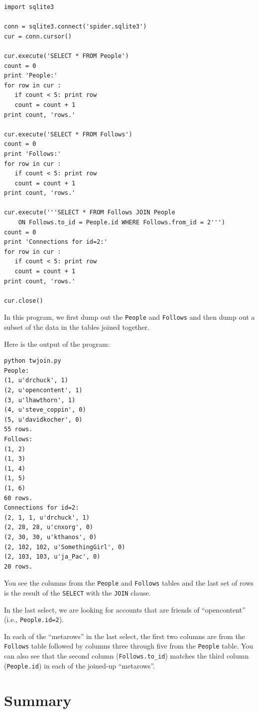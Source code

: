 \beforeverb
\begin{verbatim}
import sqlite3

conn = sqlite3.connect('spider.sqlite3')
cur = conn.cursor()

cur.execute('SELECT * FROM People')
count = 0
print 'People:'
for row in cur :
   if count < 5: print row
   count = count + 1
print count, 'rows.'

cur.execute('SELECT * FROM Follows')
count = 0
print 'Follows:'
for row in cur :
   if count < 5: print row
   count = count + 1
print count, 'rows.'

cur.execute('''SELECT * FROM Follows JOIN People 
    ON Follows.to_id = People.id WHERE Follows.from_id = 2''')
count = 0
print 'Connections for id=2:'
for row in cur :
   if count < 5: print row
   count = count + 1
print count, 'rows.'

cur.close()
\end{verbatim}
\afterverb
%
In this program, we first dump out the {\tt People}
and {\tt Follows} and then dump out a subset of the
data in the tables joined together.

Here is the output of the program:

\beforeverb
\begin{verbatim}
python twjoin.py 
People:
(1, u'drchuck', 1)
(2, u'opencontent', 1)
(3, u'lhawthorn', 1)
(4, u'steve_coppin', 0)
(5, u'davidkocher', 0)
55 rows.
Follows:
(1, 2)
(1, 3)
(1, 4)
(1, 5)
(1, 6)
60 rows.
Connections for id=2:
(2, 1, 1, u'drchuck', 1)
(2, 28, 28, u'cnxorg', 0)
(2, 30, 30, u'kthanos', 0)
(2, 102, 102, u'SomethingGirl', 0)
(2, 103, 103, u'ja_Pac', 0)
20 rows.
\end{verbatim}
\afterverb
%
You see the columns from the {\tt People} and {\tt Follows} tables and the last
set of rows is the result of the {\tt SELECT} with the {\tt JOIN} clause.

In the last select, we are looking for accounts that are friends of 
``opencontent'' (i.e., {\tt People.id=2}).

In each of the ``metarows'' in the last select, the first two columns are
from the {\tt Follows}
table followed by columns three through five from the {\tt People} table.  You can also
see that the second column (\verb"Follows.to_id") matches the third column
({\tt People.id}) in each of the joined-up ``metarows''.

\section{Summary}

